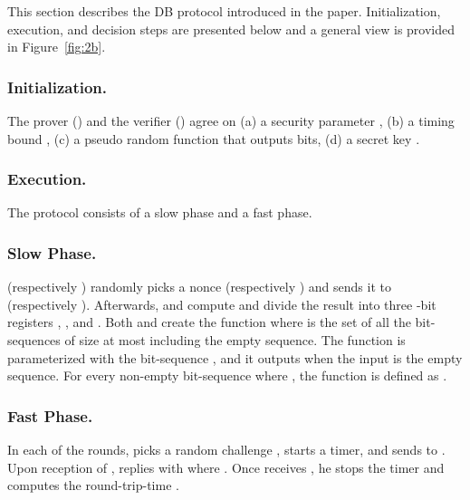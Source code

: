 \documentclass{llncs}
\begin{document}
This section describes the DB protocol introduced in the paper. Initialization, 
execution, and decision steps are presented below and a general view is 
provided in Figure~\ref{fig:2b}.

\subsubsection{Initialization.} The prover () and the verifier () agree 
on 
(a) a security parameter , (b) a timing bound , (c) 
a pseudo random function   that outputs  bits, (d) a secret key .

\subsubsection{Execution.} The protocol consists of a slow phase and a fast 
phase.

\subsubsection{Slow Phase.}  (respectively  ) randomly picks a nonce 
 (respectively ) and sends it to  (respectively  ). 
Afterwards,  and  compute  and divide the 
result into three -bit registers , , and . Both  and  
create the function  where  
is the set of all the bit-sequences of size at most  including the empty 
sequence. The function  is parameterized with the bit-sequence , and it outputs  when the input is the empty sequence. For 
every non-empty bit-sequence  where , the 
function is defined as .

\subsubsection{Fast Phase.} In each of the  rounds,  picks a random 
challenge , starts a timer, and sends  to . 
Upon reception of ,  replies with  
where . Once  receives , he stops the timer and 
computes the round-trip-time .
\end{document}
